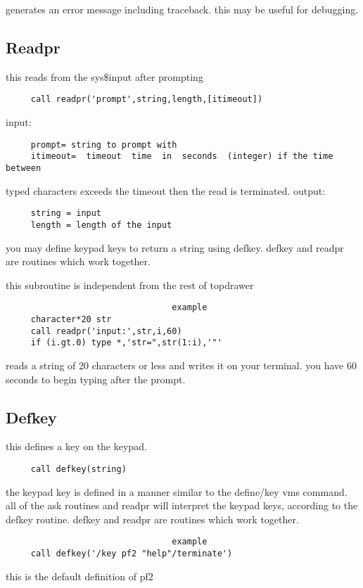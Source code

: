 generates  an  error message including traceback.  this may be useful for
debugging.  
\subsection{Readpr}
this reads from the sys\$input after prompting 
\begin{verbatim}
     call readpr('prompt',string,length,[itimeout]) 
\end{verbatim}

input:  
\begin{verbatim}
     prompt= string to prompt with 
     itimeout=  timeout  time  in  seconds  (integer) if the time between
\end{verbatim}
typed characters exceeds the timeout then the read is terminated.  
output:  
\begin{verbatim}
     string = input 
     length = length of the input 
\end{verbatim}

you  may  define keypad keys to return a string using defkey.  defkey and
readpr are routines which work together.  

this subroutine is independent from the rest of topdrawer 

\begin{verbatim}
                                 example
     character*20 str 
     call readpr('input:',str,i,60) 
     if (i.gt.0) type *,'str=",str(1:i),'"' 
\end{verbatim}
reads  a  string of 20 characters or less and writes it on your terminal.
you have 60 seconds to begin typing after the prompt.  
\subsection{Defkey}
this defines a key on the keypad.  
\begin{verbatim}
     call defkey(string) 
\end{verbatim}

the  keypad  key  is  defined  in  a manner similar to the define/key vms
command.  all of the ask routines and readpr will  interpret  the  keypad
keys,  according  to  the defkey routine.  defkey and readpr are routines
which work together.  

\begin{verbatim}
                                 example
     call defkey('/key pf2 "help"/terminate') 
\end{verbatim}
this is the default definition of pf2 
